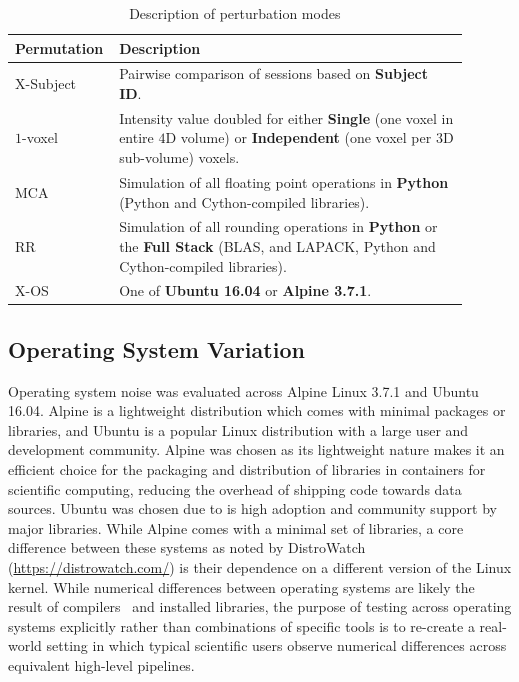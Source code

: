 \documentclass[fleqn,12pt]{SelfArx_ch} %
\begin{document}
\begin{table}[b!]
    \caption{Description of perturbation modes}
    \begin{center}
    \begin{tabular}{p{0.15\linewidth} p{0.75\linewidth}}
    \textbf{Permutation} & \textbf{Description} \\
    \hline
    X-Subject &
    Pairwise comparison of sessions based on \textbf{Subject ID}.
    \\
    $1$-voxel &
    Intensity value doubled for either \textbf{Single} (one voxel in entire
    $4$D volume) or \textbf{Independent} (one voxel per $3$D sub-volume) voxels.
    \\
    MCA &
    Simulation of all floating point operations in \textbf{Python} (Python and
    Cython-compiled libraries).
    \\
    RR &
    Simulation of all rounding operations in \textbf{Python} or the
    \textbf{Full Stack} (BLAS, and LAPACK, Python and Cython-compiled libraries).
    \\
    X-OS &
    One of \textbf{Ubuntu 16.04} or \textbf{Alpine 3.7.1}.
    \end{tabular}
    \label{tab1}
    \end{center}
\end{table}

\subsection{Operating System Variation}
Operating system noise was evaluated across Alpine Linux 3.7.1 and Ubuntu 16.04. Alpine is a lightweight distribution
which comes with minimal packages or libraries, and Ubuntu is a popular Linux distribution with a large user and
development community. Alpine was chosen as its lightweight nature makes it an efficient choice for the packaging and
distribution of libraries in containers for scientific computing, reducing the overhead of shipping code towards data
sources. Ubuntu was chosen due to is high adoption and community support by major libraries. While Alpine comes with a
minimal set of libraries, a core difference between these systems as noted by DistroWatch
(\href{https://distrowatch.com/}{https://distrowatch.com/}) is their dependence on a different version of the Linux
kernel. While numerical differences between operating systems are likely the result of compilers~\cite{sawaya2017flit}
and installed libraries, the purpose of testing across operating systems explicitly rather than combinations of
specific tools is to re-create a real-world setting in which typical scientific users observe numerical differences
across equivalent high-level pipelines.
\end{document}
